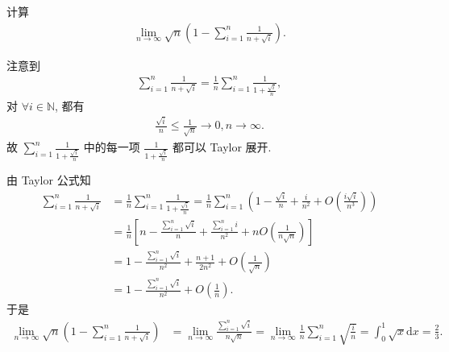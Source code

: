 \documentclass[../../main.tex]{subfiles}%
\begin{document}
\begin{example}
计算
\begin{align*}
\lim_{n \to \infty} \sqrt{n} \left( 1 - \sum_{i=1}^n \frac{1}{n + \sqrt{i}} \right).
\end{align*}
\end{example}
\begin{note}
注意到
\begin{align*}
\sum_{i=1}^n \frac{1}{n + \sqrt{i}} = \frac{1}{n} \sum_{i=1}^n \frac{1}{1 + \frac{\sqrt{i}}{n}},
\end{align*}
对 $\forall i \in \mathbb{N}$, 都有
\begin{align*}
\frac{\sqrt{i}}{n} \leqslant \frac{1}{\sqrt{n}} \rightarrow 0, n \rightarrow \infty.
\end{align*}
故 $\sum_{i=1}^n \frac{1}{1 + \frac{\sqrt{i}}{n}}$ 中的每一项 $\frac{1}{1 + \frac{\sqrt{i}}{n}}$ 都可以 Taylor 展开.
\end{note}
\begin{solution}
由 Taylor 公式知
\begin{align*}
\sum_{i=1}^n \frac{1}{n + \sqrt{i}} &= \frac{1}{n} \sum_{i=1}^n \frac{1}{1 + \frac{\sqrt{i}}{n}} = \frac{1}{n} \sum_{i=1}^n \left( 1 - \frac{\sqrt{i}}{n} + \frac{i}{n^2} + O\left( \frac{i\sqrt{i}}{n^3} \right) \right) \\
&= \frac{1}{n} \left[ n - \frac{\sum\limits_{i=1}^n \sqrt{i}}{n} + \frac{\sum\limits_{i=1}^n i}{n^2} + nO\left( \frac{1}{n\sqrt{n}} \right) \right] \\
&= 1 - \frac{\sum\limits_{i=1}^n \sqrt{i}}{n^2} + \frac{n + 1}{2n^2} + O\left( \frac{1}{\sqrt{n}} \right) \\
&= 1 - \frac{\sum\limits_{i=1}^n \sqrt{i}}{n^2} + O\left( \frac{1}{n} \right).
\end{align*}
于是
\begin{align*}
\lim_{n \rightarrow \infty} \sqrt{n} \left( 1 - \sum_{i=1}^n \frac{1}{n + \sqrt{i}} \right) &= \lim_{n \rightarrow \infty} \frac{\sum\limits_{i=1}^n \sqrt{i}}{n\sqrt{n}} = \lim_{n \rightarrow \infty} \frac{1}{n} \sum\limits_{i=1}^n \sqrt{\frac{i}{n}} = \int_0^1 \sqrt{x} \mathrm{d}x = \frac{2}{3}.
\end{align*}

\end{solution}
\end{document}
